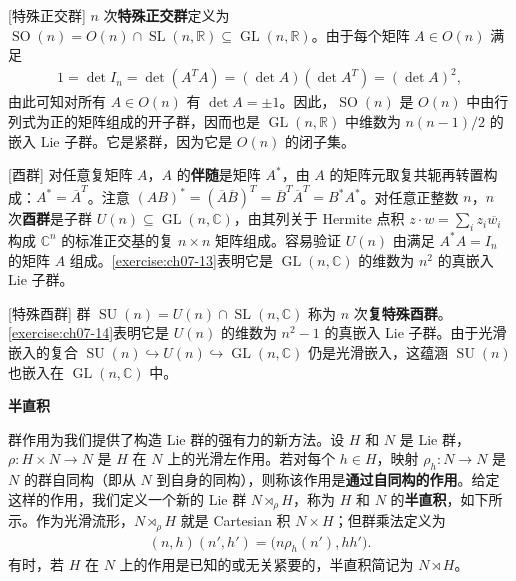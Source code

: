 \documentclass[../../main.tex]{subfiles}
\begin{document}
\begin{example}\label{example:ch07-28}[特殊正交群]
$n$ 次\textbf{特殊正交群}定义为 $\operatorname{SO}(n)=O(n)\cap\operatorname{SL}(n,\mathbb{R})\subseteq\operatorname{GL}(n,\mathbb{R})$。由于每个矩阵 $A\in O(n)$ 满足
\begin{align*}
1=\det I_n=\det(A^{T}A)=(\det A)(\det A^{T})=(\det A)^2,
\end{align*}
由此可知对所有 $A\in O(n)$ 有 $\det A=\pm1$。因此，$\operatorname{SO}(n)$ 是 $O(n)$ 中由行列式为正的矩阵组成的开子群，因而也是 $\operatorname{GL}(n,\mathbb{R})$ 中维数为 $n(n-1)/2$ 的嵌入 Lie 子群。它是紧群，因为它是 $O(n)$ 的闭子集。
\end{example}

\begin{example}\label{example:ch07-29}[酉群]
对任意复矩阵 $A$，$A$ 的\textbf{伴随}是矩阵 $A^*$，由 $A$ 的矩阵元取复共轭再转置构成：$A^*=\overline{A}^{T}$。注意 $(AB)^*=(\overline{A}\overline{B})^{T}=\overline{B}^{T}\overline{A}^{T}=B^{*}A^{*}$。对任意正整数 $n$，$n$ 次\textbf{酉群}是子群 $U(n)\subseteq\operatorname{GL}(n,\mathbb{C})$，由其列关于 Hermite 点积 $z\cdot w=\sum_i z_i\overline{w_i}$ 构成 $\mathbb{C}^n$ 的标准正交基的复 $n\times n$ 矩阵组成。容易验证 $U(n)$ 由满足 $A^{*}A=I_n$ 的矩阵 $A$ 组成。\cref{exercise:ch07-13}表明它是 $\operatorname{GL}(n,\mathbb{C})$ 的维数为 $n^2$ 的真嵌入 Lie 子群。
\end{example}

\begin{example}\label{example:ch07-30}[特殊酉群]
群 $\operatorname{SU}(n)=U(n)\cap\operatorname{SL}(n,\mathbb{C})$ 称为 $n$ 次\textbf{复特殊酉群}。\cref{exercise:ch07-14}表明它是 $U(n)$ 的维数为 $n^2-1$ 的真嵌入 Lie 子群。由于光滑嵌入的复合 $\operatorname{SU}(n)\hookrightarrow U(n)\hookrightarrow\operatorname{GL}(n,\mathbb{C})$ 仍是光滑嵌入，这蕴涵 $\operatorname{SU}(n)$ 也嵌入在 $\operatorname{GL}(n,\mathbb{C})$ 中。
\end{example}

\textbf{半直积}

群作用为我们提供了构造 Lie 群的强有力的新方法。设 $H$ 和 $N$ 是 Lie 群，$\rho\colon H\times N\to N$ 是 $H$ 在 $N$ 上的光滑左作用。若对每个 $h\in H$，映射 $\rho_h\colon N\to N$ 是 $N$ 的群自同构（即从 $N$ 到自身的同构），则称该作用是\textbf{通过自同构的作用}。给定这样的作用，我们定义一个新的 Lie 群 $N\rtimes_\rho H$，称为 $H$ 和 $N$ 的\textbf{半直积}，如下所示。作为光滑流形，$N\rtimes_\rho H$ 就是 Cartesian 积 $N\times H$；但群乘法定义为
\begin{align}
(n,h)(n',h')=\bigl(n\rho_h(n'),hh'\bigr).\label{align:ch07-10}
\end{align}
有时，若 $H$ 在 $N$ 上的作用是已知的或无关紧要的，半直积简记为 $N\rtimes H$。
\end{document}
